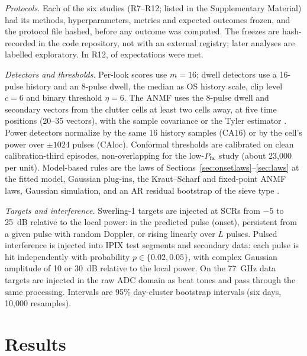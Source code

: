 \documentclass[journal]{IEEEtran}
\begin{document}
\emph{Protocols.} Each of the six studies (R7--R12; listed in the Supplementary Material) had its methods, hyperparameters, metrics and expected outcomes frozen, and the protocol file hashed, before any outcome was computed. The freezes are hash-recorded in the code repository, not with an external registry; later analyses are labelled exploratory. In R12, \RTwelveMet{} of \RTwelveAll{} expectations were met.

\emph{Detectors and thresholds.} Per-look scores use $m=16$; dwell detectors use a 16-pulse history and an 8-pulse dwell, the median as OS history scale, clip level $c=6$ and binary threshold $\eta=6$. The ANMF uses the 8-pulse dwell and secondary vectors from the clutter cells at least two cells away, at five time positions (20--35 vectors), with the sample covariance or the Tyler estimator \cite{pascal2008fp}. Power detectors normalize by the same 16 history samples (CA16) or by the cell's power over $\pm1024$ pulses (CAloc). Conformal thresholds are calibrated on clean calibration-third episodes, non-overlapping for the low-$P_{\rm fa}$ study (about 23,000 per unit). Model-based rules are the laws of Sections~\ref{sec:onsetlaws}--\ref{sec:laws} at the fitted model, Gaussian plug-ins, the Kraut--Scharf and fixed-point ANMF laws, Gaussian simulation, and an AR residual bootstrap of the sieve type \cite{qu2024sieve}.

\emph{Targets and interference.} Swerling-1 targets are injected at SCRs from $-5$ to 25~dB relative to the local power: in the predicted pulse (onset), persistent from a given pulse with random Doppler, or rising linearly over $L$ pulses. Pulsed interference is injected into IPIX test segments and secondary data: each pulse is hit independently with probability $p\in\{0.02,0.05\}$, with complex Gaussian amplitude of 10 or 30~dB relative to the local power. On the 77~GHz data targets are injected in the raw ADC domain as beat tones and pass through the same processing. Intervals are 95\% day-cluster bootstrap intervals (six days, 10,000 resamples).

\section{Results}
\end{document}
